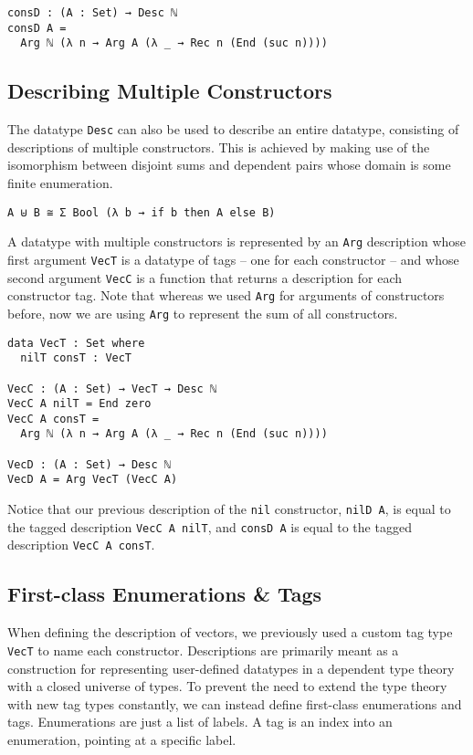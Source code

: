 \documentclass[preprint,nonatbib]{sigplanconf}
\begin{document}
\begin{verbatim}
consD : (A : Set) → Desc ℕ
consD A =
  Arg ℕ (λ n → Arg A (λ _ → Rec n (End (suc n))))
\end{verbatim}

\subsection{Describing Multiple Constructors}
\label{sec:background:multiple}

The datatype {\tt Desc} can also be used to describe an entire
datatype, consisting of descriptions of multiple constructors.
This is achieved by making use of the isomorphism between disjoint
sums and dependent pairs whose domain is some finite enumeration.

\begin{verbatim}
A ⊎ B ≅ Σ Bool (λ b → if b then A else B)
\end{verbatim}

A datatype with multiple constructors is represented by an
{\tt Arg} description whose first argument {\tt VecT} is a datatype of tags
-- one for each constructor -- and whose second argument {\tt VecC} is
a function that returns a description for each constructor tag. Note
that whereas we used {\tt Arg} for arguments of constructors before,
now we are using {\tt Arg} to represent the sum of all constructors.

\begin{verbatim}
data VecT : Set where
  nilT consT : VecT

VecC : (A : Set) → VecT → Desc ℕ
VecC A nilT = End zero
VecC A consT =
  Arg ℕ (λ n → Arg A (λ _ → Rec n (End (suc n))))

VecD : (A : Set) → Desc ℕ
VecD A = Arg VecT (VecC A)
\end{verbatim}

Notice that our previous description of the {\tt nil} constructor,
{\tt nilD A}, is equal to the tagged description
{\tt VecC A nilT}, and {\tt consD A}
is equal to the tagged description
{\tt VecC A consT}.

\subsection{First-class Enumerations \& Tags}
\label{sec:background:case}

When defining the description of vectors, we previously used a custom
tag type {\tt VecT} to name each constructor. Descriptions are
primarily meant as a construction for representing user-defined
datatypes in a dependent type theory with a closed universe of types.
To prevent the need to extend the type theory with new tag types
constantly, we can instead define first-class enumerations and tags.
Enumerations are just a list of labels. A tag is an index into an
enumeration, pointing at a specific label.
\end{document}
